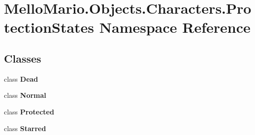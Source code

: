 \section{Mello\+Mario.\+Objects.\+Characters.\+Protection\+States Namespace Reference}
\label{namespaceMelloMario_1_1Objects_1_1Characters_1_1ProtectionStates}
\subsection*{Classes}
\begin{DoxyCompactItemize}
\item 
class \textbf{ Dead}
\item 
class \textbf{ Normal}
\item 
class \textbf{ Protected}
\item 
class \textbf{ Starred}
\end{DoxyCompactItemize}

